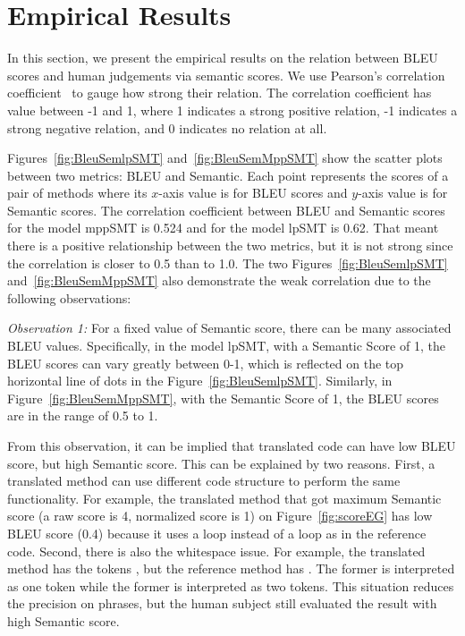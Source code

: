 \section{Empirical Results}
\label{sec:bleuresult}

In this section, we present the empirical results on the relation
between BLEU scores and human judgements via semantic scores.  We use
Pearson's correlation coefficient~\cite{PearsonCorrelation} to gauge
how strong their relation. The correlation coefficient has value
between -1 and 1, where 1 indicates a strong positive relation, -1
indicates a strong negative relation, and 0 indicates no relation at
all.

Figures~\ref{fig:BleuSemlpSMT} and~\ref{fig:BleuSemMppSMT} show the
scatter plots between two metrics: BLEU and Semantic. Each point
represents the scores of a pair of methods where its $x$-axis value is
for BLEU scores and $y$-axis value is for Semantic scores. The
correlation coefficient between BLEU and Semantic scores for the model
mppSMT is 0.524 and for the model lpSMT is 0.62. That meant there is a
positive relationship between the two metrics, but it is not strong
since the correlation is closer to 0.5 than to 1.0. The two
Figures~\ref{fig:BleuSemlpSMT} and~\ref{fig:BleuSemMppSMT} also
demonstrate the weak correlation due to the following observations:

\emph{Observation 1:} For a fixed value of Semantic score, there can
be many associated BLEU values. Specifically, in the model lpSMT, with
a Semantic Score of 1, the BLEU scores can vary greatly between 0-1,
which is reflected on the top horizontal line of dots in the
Figure~\ref{fig:BleuSemlpSMT}. Similarly, in
Figure~\ref{fig:BleuSemMppSMT}, with the Semantic Score of 1, the BLEU
scores are in the range of 0.5 to 1.

From this observation, it can be implied that translated code can have
low BLEU score, but high Semantic score. This can be explained by two
reasons. First, a translated method can use different code structure
to perform the same functionality. For example, the translated method
that got maximum Semantic score (a raw score is 4, normalized score is
1) on Figure~\ref{fig:scoreEG} has low BLEU score (0.4) because it
uses a  loop instead of a  loop as in the
reference code. Second, there is also the whitespace issue. For
example, the translated method has the tokens , but the
reference method has . The former is interpreted as one
token while the former is interpreted as two tokens. This situation
reduces the precision on phrases, but the human subject still
evaluated the result with high Semantic score.

